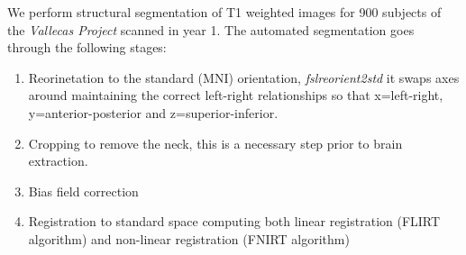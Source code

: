 \documentclass[9pt,twocolumn,twoside]{pnas-new}
\begin{document}
We perform structural segmentation of T1 weighted images for 900 subjects of the \emph{Vallecas Project} scanned in year 1.
The automated segmentation goes through the following stages:
\begin{enumerate}  
	\item Reorinetation to the standard (MNI) orientation, \emph{fslreorient2std} it swaps axes around maintaining the correct left-right relationships so that x=left-right, y=anterior-posterior and z=superior-inferior. 
	\item Cropping to remove the neck, this is a necessary step prior to brain extraction. 
	\item Bias field correction 
	\item Registration to standard space computing both linear registration (FLIRT algorithm) and non-linear registration (FNIRT algorithm)

\end{enumerate}
\end{document}
